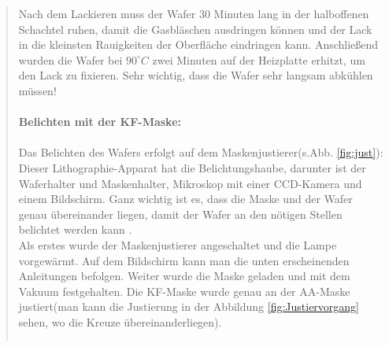 \begin{quote}
    		Nach dem Lackieren muss der Wafer 30 Minuten lang in der halboffenen
    		Schachtel ruhen, damit die Gasbläschen ausdringen können und der Lack in
    		die kleinsten Rauigkeiten der Oberfläche eindringen kann.
    		Anschließend wurden die Wafer bei $90^{\circ}C$ zwei Minuten auf der
    		Heizplatte erhitzt, um den Lack zu fixieren. Sehr wichtig, dass die
    		Wafer sehr langsam abkühlen müssen!\\
			\\
			\textbf{Belichten mit der KF-Maske:}\\
			\\
			Das Belichten des Wafers erfolgt auf dem Maskenjustierer(s.Abb.
			\ref{fig:just}): Dieser Lithographie-Apparat hat die
			Belichtungshaube, darunter ist der Waferhalter und Maskenhalter,
			Mikroskop mit einer CCD-Kamera und einem Bildschirm.
			Ganz wichtig ist es, dass die Maske und der Wafer genau übereinander
			liegen, damit der Wafer an den nötigen Stellen belichtet werden kann
			.\\
 			Als erstes wurde der Maskenjustierer angeschaltet und die Lampe
 			vorgewärmt. Auf dem Bildschirm kann man die unten erscheinenden
 			Anleitungen befolgen. Weiter wurde die Maske geladen und mit dem
 			Vakuum festgehalten. Die KF-Maske wurde genau an der AA-Maske
 			justiert(man kann die Justierung in der Abbildung
 			\ref{fig:Justiervorgang} sehen, wo die Kreuze übereinanderliegen).

 			\vspace{2em}

    		\begin{center}
                \begin{tabular}{ll}


\end{tabular}
\end{center}
\end{quote}
